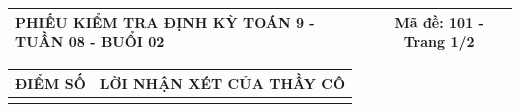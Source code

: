 \documentclass[12pt,a4paper]{article}
\begin{document}
\pagestyle{empty}

\noindent
\begin{tabularx}{\linewidth}{|X|c|}
\hline
\textbf{PHIẾU KIỂM TRA ĐỊNH KỲ TOÁN 9 - TUẦN 08 - BUỔI 02} & \textbf{Mã đề: 101 - Trang 1/2} \\
\hline
\end{tabularx}

\vspace{1.0mm}

\noindent
\begin{tabularx}{\linewidth}{|p{3.2cm}|X|}
\hline
\centering\textbf{ĐIỂM SỐ} & \centering\textbf{LỜI NHẬN XÉT CỦA THẦY CÔ} \tabularnewline
\hline
\rule{0pt}{1.8cm} & \tabularnewline
\hline
\end{tabularx}
\end{document}
